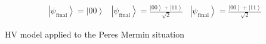 \documentclass[british,aps,prl,superscriptaddress,nofootinbib,times,reprint]{revtex4-1}
\theoremstyle{plain}
\theoremstyle{definition}
\theoremstyle{remark}
\theoremstyle{remark}
\theoremstyle{remark}
\theoremstyle{plain}
\theoremstyle{plain}
\theoremstyle{plain}
\theoremstyle{definition}
\theoremstyle{definition}
\begin{document}
\begin{table}
\begin{equation*}
\begin{array}{ccc}
\left|\psi_{\text{final}}\right\rangle = \left|00\right\rangle  & \left|\psi_{\text{final}}\right\rangle = \frac{\left|00\right\rangle +\left|11\right\rangle}{\sqrt{2}} & \left|\psi_{\text{final}}\right\rangle = \frac{\left|00\right\rangle+\left|11\right\rangle }{\sqrt{2}}


\label{eq:toyModel}
\end{array}
\end{equation*}
\caption{HV model applied to the Peres Mermin situation}
\label{tbl:HVmodel}
\end{table}
\end{document}

